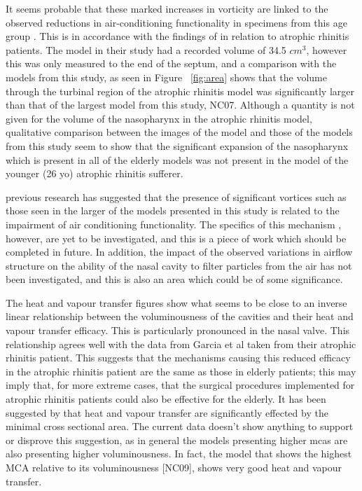 It seems probable that these marked increases in vorticity are linked to the observed reductions in air-conditioning functionality in specimens from this age group \cite{Lindemann2009a}. This is in accordance with the findings of \cite{Garcia2007} in relation to atrophic rhinitis patients. The model in their study had a recorded volume of 34.5 $cm^3$, however this was only measured to the end of the septum, and a comparison with the models from this study, as seen in Figure ~\ref{fig:area} shows that the volume through the turbinal region of the atrophic rhinitis model was significantly larger than that of the largest model from this study, NC07. Although a quantity is not given for the volume of the nasopharynx in the atrophic rhinitis model, qualitative comparison between the  images of the model and those of the models from this study seem to show that the significant expansion of the nasopharynx which is present in all of the elderly models was not present in the model of the younger (26 yo) atrophic rhinitis sufferer. 

previous research has suggested that the presence of significant vortices such as those seen in the larger of the models presented in this study is related to the impairment of air conditioning functionality. The specifics of this mechanism , however, are yet to be investigated, and this is a piece of work which should be completed in future. In addition, the impact of the observed variations in airflow structure on the ability of the nasal cavity to filter particles from the air has not been investigated, and this is also an area which could be of some significance.

The heat and vapour transfer figures show what seems to be close to an inverse linear relationship between the voluminousness of the cavities and their heat and vapour transfer efficacy. This is particularly pronounced in the nasal valve. This relationship agrees well with the data from Garcia et al \cite{Garcia2007} taken from their atrophic rhinitis patient. This suggests that the mechanisms causing this reduced efficacy in the atrophic rhinitis patient are the same as those in elderly patients; this may imply that, for more extreme cases, that the surgical procedures implemented for atrophic rhinitis patients could also be effective for the elderly. It has been suggested by \cite{Lindemann2008} that heat and vapour transfer are significantly effected by the minimal cross sectional area. The current data doesn't show anything to support or disprove this suggestion, as in general the models presenting higher mcas are also presenting higher voluminousness. In fact, the model that shows the highest MCA relative to its voluminousness [NC09], shows very good heat and vapour transfer.

